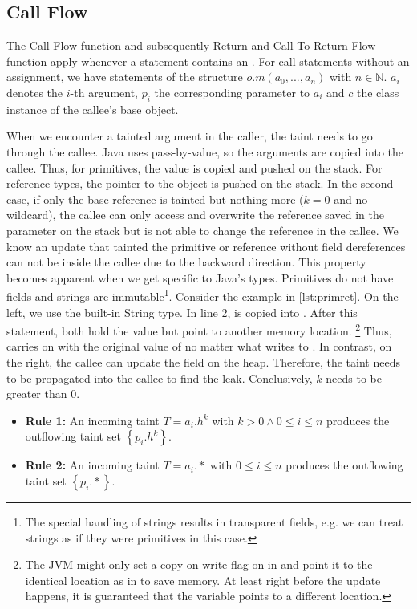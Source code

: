 \documentclass[../draft.tex]{subfiles}
\begin{document}
    \subsection{Call Flow}
    The Call Flow function and subsequently Return and Call To Return Flow function apply whenever a statement contains an .
    For call statements without an assignment, we have statements of the structure $o.m(a_0, ..., a_n)$ with $n \in \mathbb{N}$. $a_i$ denotes the $i$-th argument, $p_i$ the corresponding parameter to $a_i$ and $c$ the class instance of the callee's base object.

    When we encounter a tainted argument in the caller, the taint needs to go through the callee. 
    Java uses pass-by-value, so the arguments are copied into the callee. 
    Thus, for primitives, the value is copied and pushed on the stack. 
    For reference types, the pointer to the object is pushed on the stack. 
    In the second case, if only the base reference is tainted but nothing more ($k=0$ and no wildcard), the callee can only access and overwrite the reference saved in the parameter on the stack but is not able to change the reference in the callee.
    We know an update that tainted the primitive or reference without field dereferences can not be inside the callee due to the backward direction. 
    This property becomes apparent when we get specific to Java's types. 
    Primitives do not have fields and strings are immutable\footnote{The special handling of strings results in transparent fields, e.g. we can treat strings as if they were primitives in this case.}. 
    Consider the example in \autoref{lst:primret}. 
    On the left, we use the built-in String type. 
    In line 2,  is copied into . 
    After this statement, both  hold the value  but point to another memory location\footnotemark{}.
    \footnote{%
        The JVM might only set a copy-on-write flag on  in  and point it to the identical location as  in  to save memory. 
        At least right before the update happens, it is guaranteed that the variable points to a different location.
    }
    Thus,  carries on with the original value of  no matter what  writes to .
    In contrast, on the right, the callee can update the field on the heap. 
    Therefore, the taint needs to be propagated into the callee to find the leak. 
    Conclusively, $k$ needs to be greater than $0$.
    \begin{itemize}
        \item[] \textbf{Rule 1:} An incoming taint $T=a_i.h^k$ with $k > 0 \land 0 \leq i \leq n$ produces the outflowing taint set $\left\{p_i.h^k\right\}$.
        \item[] \textbf{Rule 2:} An incoming taint $T=a_i.*$ with $0 \leq i \leq n$ produces the outflowing taint set $\left\{p_i.*\right\}$.
    \end{itemize}
\end{document}

